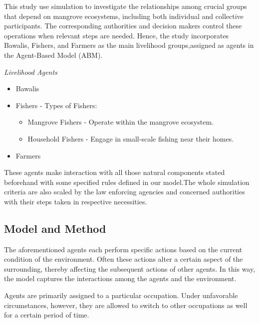 \documentclass[final,5p,times,twocolumn,authoryear]{elsarticle}
\begin{document}
This study use simulation to investigate the relationships among crucial groups that depend on mangrove ecosystems, including both individual and collective participants. The corresponding authorities and decision makers control these operations when relevant steps are needed. Hence, the study incorporates Bawalis, Fishers, and Farmers as the main livelihood groups,assigned as agents in the Agent-Based Model (ABM).
\vspace{.5cm}

\textit{Livelihood Agents}
\begin{itemize} 
        \item Bawalis  
        \item Fishers - Types of Fishers:
        \begin{itemize}
            \item Mangrove Fishers - Operate within the mangrove ecosystem.
            \item Household Fishers - Engage in small-scale fishing near their homes.
        \end{itemize}
        \item Farmers
    \end{itemize}
    
These agents make interaction with all those natural components stated beforehand with some specified rules defined in our model.The whole simulation criteria are also scaled by the law enforcing agencies and concerned authorities with their steps taken in respective necessities.


\subsection{Model and Method}


The aforementioned agents each perform specific actions based on the current condition of the environment. Often these actions alter a certain aspect of the surrounding, thereby affecting the subsequent actions of other agents. In this way, the model captures the interactions among the agents and the environment.

Agents are primarily assigned to a particular occupation. Under unfavorable circumstances, however, they are allowed to switch to other occupations as well for a certain period of time.
\end{document}
